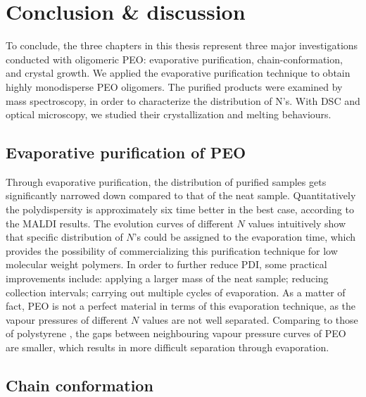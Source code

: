 \chapter{Conclusion \& discussion}

To conclude, the three chapters in this thesis represent three major investigations conducted with oligomeric PEO: evaporative purification, chain-conformation, and crystal growth. We applied the evaporative purification technique to obtain highly monodisperse PEO oligomers. The purified products were examined by mass spectroscopy, in order to characterize the distribution of N’s. With DSC and optical microscopy, we studied their crystallization and melting behaviours.

\section{Evaporative purification of PEO}

Through evaporative purification, the distribution of purified samples gets significantly narrowed down compared to that of the neat sample. Quantitatively the polydispersity is approximately six time better in the best case, according to the MALDI results. The evolution curves of different $N$ values intuitively show that specific distribution of $N$’s could be assigned to the evaporation time, which provides the possibility of commercializing this purification technique for low molecular weight polymers. In order to further reduce PDI, some practical improvements include: applying a larger mass of the neat sample; reducing collection intervals; carrying out multiple cycles of evaporation. As a matter of fact, PEO is not a perfect material in terms of this evaporation technique, as the vapour pressures of different $N$ values are not well separated. Comparing to those of polystyrene \cite{Zhu2017a}, the gaps between neighbouring vapour pressure curves of PEO are smaller, which results in more difficult separation through evaporation.

\section{Chain conformation}

